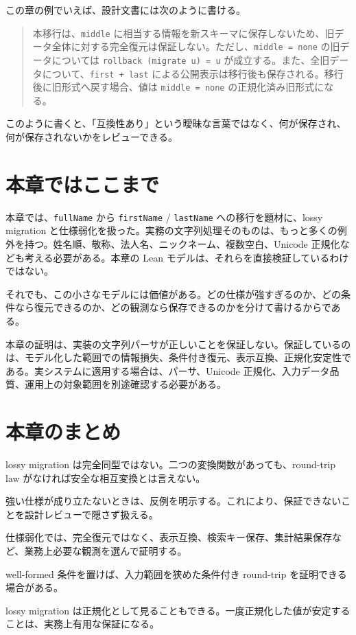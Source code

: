 この章の例でいえば、設計文書には次のように書ける。

\begin{quote}
本移行は、\texttt{middle} に相当する情報を新スキーマに保存しないため、旧データ全体に対する完全復元は保証しない。ただし、\texttt{middle = none} の旧データについては \texttt{rollback (migrate u) = u} が成立する。また、全旧データについて、\texttt{first + last} による公開表示は移行後も保存される。移行後に旧形式へ戻す場合、値は \texttt{middle = none} の正規化済み旧形式になる。
\end{quote}

このように書くと、「互換性あり」という曖昧な言葉ではなく、何が保存され、何が保存されないかをレビューできる。

\section{本章ではここまで}

本章では、\texttt{fullName} から \texttt{firstName} / \texttt{lastName} への移行を題材に、lossy migration と仕様弱化を扱った。実務の文字列処理そのものは、もっと多くの例外を持つ。姓名順、敬称、法人名、ニックネーム、複数空白、Unicode 正規化なども考える必要がある。本章の Lean モデルは、それらを直接検証しているわけではない。

それでも、この小さなモデルには価値がある。どの仕様が強すぎるのか、どの条件なら復元できるのか、どの観測なら保存できるのかを分けて書けるからである。

\begin{warningbox}
本章の証明は、実装の文字列パーサが正しいことを保証しない。保証しているのは、モデル化した範囲での情報損失、条件付き復元、表示互換、正規化安定性である。実システムに適用する場合は、パーサ、Unicode 正規化、入力データ品質、運用上の対象範囲を別途確認する必要がある。
\end{warningbox}

\section{本章のまとめ}

lossy migration は完全同型ではない。二つの変換関数があっても、round-trip law がなければ安全な相互変換とは言えない。

強い仕様が成り立たないときは、反例を明示する。これにより、保証できないことを設計レビューで隠さず扱える。

仕様弱化では、完全復元ではなく、表示互換、検索キー保存、集計結果保存など、業務上必要な観測を選んで証明する。

well-formed 条件を置けば、入力範囲を狭めた条件付き round-trip を証明できる場合がある。

lossy migration は正規化として見ることもできる。一度正規化した値が安定することは、実務上有用な保証になる。

